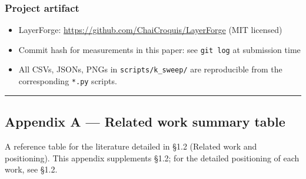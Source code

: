 \documentclass[
]{article}
\providecommand{\tightlist}{%
  \setlength{\itemsep}{0pt}\setlength{\parskip}{0pt}}
\begin{document}
\subsubsection{Project artifact}\label{project-artifact}

\begin{itemize}
\tightlist
\item
  LayerForge: \url{https://github.com/ChaiCroquis/LayerForge} (MIT
  licensed)
\item
  Commit hash for measurements in this paper: see \texttt{git\ log} at
  submission time
\item
  All CSVs, JSONs, PNGs in \texttt{scripts/k\_sweep/} are reproducible
  from the corresponding \texttt{*.py} scripts.
\end{itemize}

\begin{center}\rule{0.5\linewidth}{0.5pt}\end{center}

\subsection{Appendix A --- Related work summary
table}\label{appendix-a--related-work-summary-table}

A reference table for the literature detailed in §1.2 (Related work and
positioning). This appendix supplements §1.2; for the detailed
positioning of each work, see §1.2.
\end{document}
